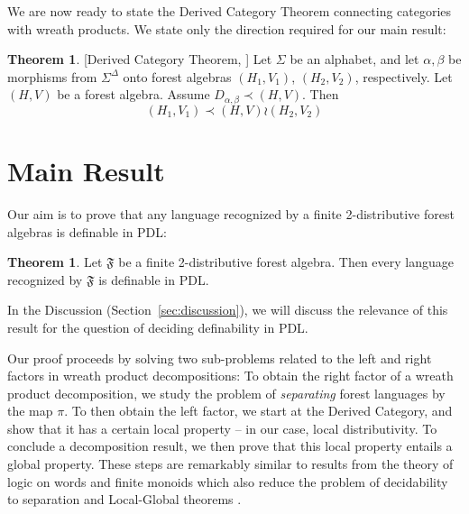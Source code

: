 \documentclass[sigplan,9pt]{acmart}\settopmatter{printfolios=true,printccs=false,printacmref=false}
\newcounter{thm}
\newcounter{theorem}
\theoremstyle{definition}
\newtheorem{theorem}[thm]{Theorem}
\newcommand{\Ff}[0]{{\mathfrak{F}}}
\begin{document}
We are now ready to state the Derived Category Theorem connecting categories with wreath products.
We state only the direction required for our main result:

\begin{theorem}\label{thm:derived-cat}[Derived Category Theorem,  \cite{straubing-forest-2018}]
Let $\Sigma$ be an alphabet, and let $\alpha, \beta$ be morphisms from $\Sigma^\Delta$ onto forest algebras $(H_1, V_1)$, $(H_2, V_2)$, respectively. Let $(H,V)$ be a forest algebra.
Assume $D_{\alpha, \beta} \prec (H,V)$. Then
$$(H_1,V_1) \prec (H,V) \wr (H_2, V_2)$$
\end{theorem}



\section{Main Result}\label{sec:main-result}

Our aim is to prove that any language recognized by a finite 2-distributive forest algebras is definable in PDL: 


\begin{theorem}\label{thm:main-result}
Let $\Ff$ be a finite 2-distributive forest algebra.
Then every language recognized by $\Ff$ is definable in PDL.
\end{theorem}
In the Discussion (Section~\ref{sec:discussion}), we will discuss the relevance of this result for the question of deciding definability in PDL.

Our proof proceeds by solving two sub-problems related to the left and right factors in wreath product decompositions:
To obtain the right factor of a wreath product decomposition, we study the problem of \emph{separating} forest languages by the map $\pi$.
To then obtain the left factor, we start at the Derived Category, and show that it has a certain local property -- in our case, local distributivity.
To conclude a decomposition result, we then prove that this local property entails a global property.
These steps are remarkably similar to results from the theory of logic on words and finite monoids which also reduce the problem of decidability to separation \cite{place-going-2014} and Local-Global theorems \cite{krebs-effective-2012}.



\end{document}
